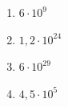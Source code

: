 %
%
  \begin{enumerate}[cols=4]
    \item $6\cdot 10^9$
    \item $1,2\cdot 10^{24}$
    \item $6\cdot 10^{29}$
    \item $4,5\cdot 10^{5}$
  \end{enumerate}

